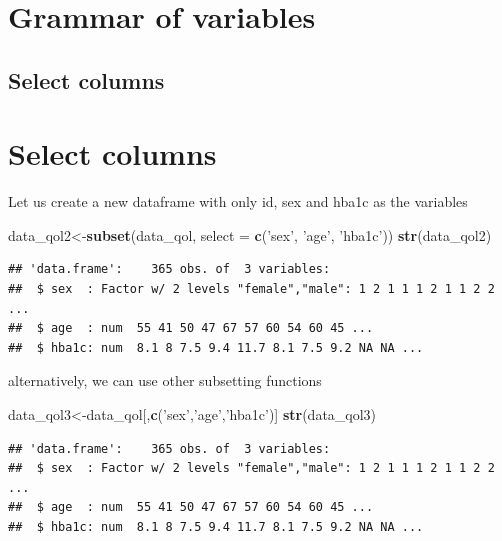 \documentclass[]{book}
\newenvironment{Shaded}{\begin{snugshade}}{\end{snugshade}}
\newcommand{\KeywordTok}[1]{\textcolor[rgb]{0.13,0.29,0.53}{\textbf{#1}}}
\newcommand{\DataTypeTok}[1]{\textcolor[rgb]{0.13,0.29,0.53}{#1}}
\newcommand{\StringTok}[1]{\textcolor[rgb]{0.31,0.60,0.02}{#1}}
\newcommand{\NormalTok}[1]{#1}
\theoremstyle{definition}
\theoremstyle{definition}
\theoremstyle{remark}
\begin{document}
\section{Grammar of variables}\label{grammar-of-variables-1}

\subsection{Select columns}\label{select-columns}

\section{Select columns}\label{select-columns-1}

Let us create a new dataframe with only id, sex and hba1c as the
variables

\begin{Shaded}
\begin{Highlighting}[]
\NormalTok{data_qol2<-}\KeywordTok{subset}\NormalTok{(data_qol, }\DataTypeTok{select =} \KeywordTok{c}\NormalTok{(}\StringTok{'sex'}\NormalTok{, }\StringTok{'age'}\NormalTok{, }\StringTok{'hba1c'}\NormalTok{))}
\KeywordTok{str}\NormalTok{(data_qol2)}
\end{Highlighting}
\end{Shaded}

\begin{verbatim}
## 'data.frame':    365 obs. of  3 variables:
##  $ sex  : Factor w/ 2 levels "female","male": 1 2 1 1 1 2 1 1 2 2 ...
##  $ age  : num  55 41 50 47 67 57 60 54 60 45 ...
##  $ hba1c: num  8.1 8 7.5 9.4 11.7 8.1 7.5 9.2 NA NA ...
\end{verbatim}

alternatively, we can use other subsetting functions

\begin{Shaded}
\begin{Highlighting}[]
\NormalTok{data_qol3<-data_qol[,}\KeywordTok{c}\NormalTok{(}\StringTok{'sex'}\NormalTok{,}\StringTok{'age'}\NormalTok{,}\StringTok{'hba1c'}\NormalTok{)]}
\KeywordTok{str}\NormalTok{(data_qol3)}
\end{Highlighting}
\end{Shaded}

\begin{verbatim}
## 'data.frame':    365 obs. of  3 variables:
##  $ sex  : Factor w/ 2 levels "female","male": 1 2 1 1 1 2 1 1 2 2 ...
##  $ age  : num  55 41 50 47 67 57 60 54 60 45 ...
##  $ hba1c: num  8.1 8 7.5 9.4 11.7 8.1 7.5 9.2 NA NA ...
\end{verbatim}
\end{document}
